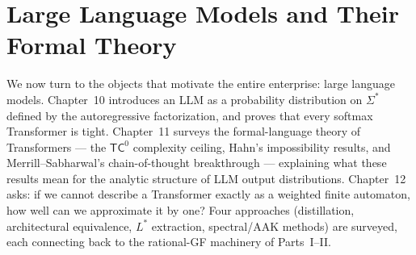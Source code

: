 \part{Large Language Models and Their Formal Theory}

We now turn to the objects that motivate the entire enterprise: large language models. Chapter~10 introduces an LLM as a probability distribution on $\Sigma^*$ defined by the autoregressive factorization, and proves that every softmax Transformer is tight. Chapter~11 surveys the formal-language theory of Transformers --- the $\mathsf{TC}^0$ complexity ceiling, Hahn's impossibility results, and Merrill--Sabharwal's chain-of-thought breakthrough --- explaining what these results mean for the analytic structure of LLM output distributions. Chapter~12 asks: if we cannot describe a Transformer exactly as a weighted finite automaton, how well can we approximate it by one? Four approaches (distillation, architectural equivalence, $L^*$ extraction, spectral/AAK methods) are surveyed, each connecting back to the rational-GF machinery of Parts~I--II.




